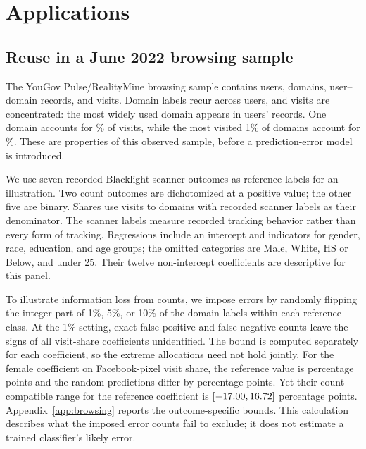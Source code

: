 \section{Applications}\label{sec:applications}
\subsection{Reuse in a June 2022 browsing sample}\label{sec:benchmark}
The YouGov Pulse/RealityMine browsing sample contains
\BenchmarkUsers{} users, \BenchmarkDomains{} domains,
\BenchmarkRecords{} user--domain records, and \BenchmarkVisits{} visits.
Domain labels recur across users, and visits are concentrated: the most
widely used domain appears in \LargestDomainUsers{} users' records. One
domain accounts for \LargestDomainVisitShare{}\% of visits, while the most
visited 1\% of domains account for \TopOnePercentDomainVisitShare{}\%.
These are properties of this observed sample, before a prediction-error
model is introduced.

We use seven recorded Blacklight scanner outcomes as reference labels for
an illustration. Two count outcomes are dichotomized at a positive value;
the other five are binary. Shares use visits to domains with recorded
scanner labels as their denominator. The scanner labels measure recorded
tracking behavior rather than every form of tracking. Regressions include
an intercept and indicators for gender, race, education, and age groups;
the omitted categories are Male, White, HS or Below, and under 25.
Their twelve non-intercept coefficients are descriptive for this panel.

To illustrate information loss from counts, we impose errors by randomly
flipping the integer part of 1\%, 5\%, or 10\% of the domain labels within
each reference class. At the 1\% setting, exact false-positive and
false-negative counts leave the signs of all \BenchmarkContrasts{}
visit-share coefficients unidentified. The bound is computed separately
for each coefficient, so the extreme allocations need not hold jointly.
For the female coefficient on Facebook-pixel visit share, the reference
value is \FocalTruth{} percentage points and the random predictions differ
by \FocalRealizedError{} percentage points. Yet their count-compatible
range for the reference coefficient is
$[-17.00{},16.72{}]$ percentage points.
Appendix~\ref{app:browsing} reports the outcome-specific bounds.
This calculation describes what the imposed error counts fail to exclude;
it does not estimate a trained classifier's likely error.

